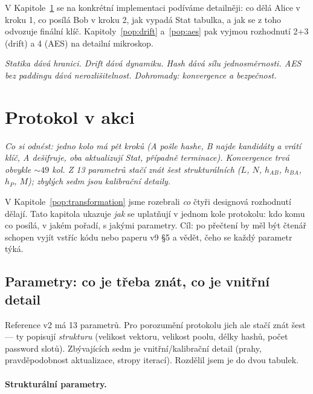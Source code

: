 \documentclass[11pt,a4paper]{article}
\begin{document}
V Kapitole~\ref{pop:protocol} se na konkrétní implementaci podíváme detailněji: co dělá Alice v kroku 1, co posílá Bob v kroku 2, jak vypadá Stat tabulka, a jak se z toho odvozuje finální klíč. Kapitoly~\ref{pop:drift} a~\ref{pop:aes} pak vyjmou rozhodnutí 2+3 (drift) a 4 (AES) na detailní mikroskop.

\medskip
\noindent\textit{Statika dává hranici. Drift dává dynamiku. Hash dává sílu jednosměrnosti. AES bez paddingu dává nerozlišitelnost. Dohromady: konvergence a bezpečnost.}

\section{Protokol v akci}\label{pop:protocol}

\noindent\textit{Co si odnést: jedno kolo má pět kroků (A pošle hashe, B najde kandidáty a vrátí klíč, A dešifruje, oba aktualizují Stat, případně terminace). Konvergence trvá obvykle $\sim 49$ kol. Z 13 parametrů stačí znát šest strukturálních ($L$, $N$, $h_{AB}$, $h_{BA}$, $h_P$, $M$); zbylých sedm jsou kalibrační detaily.}

\medskip

V Kapitole~\ref{pop:transformation} jsme rozebrali \emph{co} čtyři designová rozhodnutí dělají. Tato kapitola ukazuje \emph{jak} se uplatňují v jednom kole protokolu: kdo komu co posílá, v jakém pořadí, s jakými parametry. Cíl: po přečtení by měl být čtenář schopen vyjít vstříc kódu nebo paperu v9 §5 a vědět, čeho se každý parametr týká.

\subsection{Parametry: co je třeba znát, co je vnitřní detail}

Reference v2 má 13 parametrů. Pro porozumění protokolu jich ale stačí znát šest --- ty popisují \emph{strukturu} (velikost vektoru, velikost poolu, délky hashů, počet password slotů). Zbývajících sedm je vnitřní/kalibrační detail (prahy, pravděpodobnost aktualizace, stropy iterací). Rozdělil jsem je do dvou tabulek.

\paragraph{Strukturální parametry.}
\end{document}

